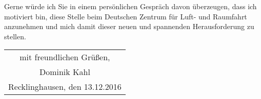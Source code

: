 \documentclass[12pt]{scrartcl}
\begin{document}
Gerne würde ich Sie in einem persönlichen Gespräch davon überzeugen, dass ich 
motiviert bin, diese Stelle beim Deutschen Zentrum für Luft- und Raumfahrt 
anzunehmen und mich damit dieser neuen und spannenden Herausforderung zu 
stellen.
\\[0.9cm]

\begin{flushright}
\begin{tabular}{c}
mit freundlichen Grüßen, 		\\[0.2cm]
Dominik Kahl 					\\[0.2cm]
Recklinghausen, den 13.12.2016 	\\[0.2cm]
\end{tabular}
\end{flushright}
\end{document}

